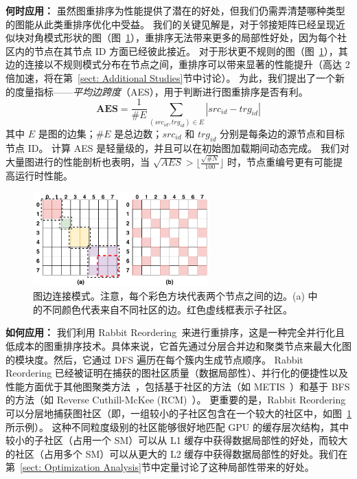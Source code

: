 \textbf{何时应用：} 虽然图重排序为性能提供了潜在的好处，但我们仍需弄清楚哪种类型的图能从此类重排序优化中受益。
我们的关键见解是，对于邻接矩阵已经呈现近似块对角模式形状的图（图~\ref{fig: node-renumbering}），重排序无法带来更多的局部性好处，因为每个社区内的节点在其节点 ID 方面已经彼此接近。
对于形状更不规则的图（图~\ref{fig: node-renumbering}），其边的连接以不规则模式分布在节点之间，重排序可以带来显著的性能提升（高达 2 倍加速，将在第~\ref{sect: Additional Studies}节中讨论）。
为此，我们提出了一个新的度量指标——\textit{平均边跨度}（AES），用于判断进行图重排序是否有利。
\begin{equation}  \label{equ: graph diameter}
    \mathbf{AES} = \frac{1}{\# E} \sum\limits_{(src_{id}, trg_{id}) \in E} |src_{id} - trg_{id}|
\end{equation}
其中 $E$ 是图的边集；$\#E$ 是总边数；$src_{id}$ 和 $trg_{id}$ 分别是每条边的源节点和目标节点 ID。
计算 AES 是轻量级的，并且可以在初始图加载期间动态完成。
我们对大量图进行的性能剖析也表明，当 $\sqrt{AES} > \lfloor\frac{\sqrt{\#N}}{100}\rfloor$ 时，节点重编号更有可能提高运行时性能。
\begin{figure}[htbp] %
    \centering
    \includegraphics[width=0.6\textwidth]{images/node-renumbering.pdf} %
    \vspace{-2pt} %
    \caption{图边连接模式。注意，每个彩色方块代表两个节点之间的边。(a) 中的不同颜色代表来自不同社区的边。红色虚线框表示子社区。}
    \label{fig: node-renumbering} %
    \vspace{-10pt}
\end{figure}

\textbf{如何应用：}
我们利用 Rabbit Reordering~\cite{rabbit-order}来进行重排序，这是一种完全并行化且低成本的图重排序技术。具体来说，它首先通过分层合并边和聚类节点来最大化图的模块度。然后，它通过 DFS 遍历在每个簇内生成节点顺序。
Rabbit Reordering 已经被证明在捕获的图社区质量（数据局部性）、并行化的便捷性以及性能方面优于其他图聚类方法~\cite{metis, boldi2011layered, raghavan2007near, karantasis2014parallelization, RCM-Algorithm}，包括基于社区的方法（如 METIS~\cite{metis}）和基于 BFS 的方法（如 Reverse Cuthill-McKee (RCM)~\cite{RCM-Algorithm}）。
更重要的是，Rabbit Reordering 可以分层地捕获图社区（即，一组较小的子社区包含在一个较大的社区中，如图~\ref{fig: node-renumbering}所示例）。
这种不同粒度级别的社区能够很好地匹配 GPU 的缓存层次结构，其中较小的子社区（占用一个 SM）可以从 L1 缓存中获得数据局部性的好处，而较大的社区（占用多个 SM）可以从更大的 L2 缓存中获得数据局部性的好处。我们在第~\ref{sect: Optimization Analysis}节中定量讨论了这种局部性带来的好处。

